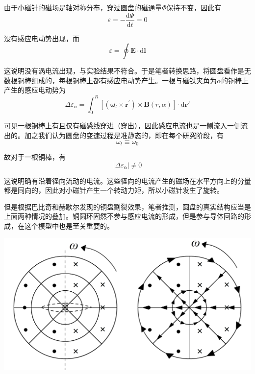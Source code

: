 \documentclass{CLGPY}
\begin{document}
\begin{multicols}{1}
由于小磁针的磁场是轴对称分布，穿过圆盘的磁通量$\Phi$保持不变，因此有
\begin{equation}
\varepsilon=-\frac{\mathrm{d} \Phi}{\mathrm{d} t}=0
\end{equation}

没有感应电动势出现，而
\begin{equation}
\varepsilon=\oint \boldsymbol{E} \cdot \mathrm{d} \boldsymbol{l}
\end{equation}

这说明没有涡电流出现，与实验结果不符合。于是笔者转换思路，将圆盘看作是无数根铜棒组成的，每根铜棒上都有感应电动势产生。一根与磁铁夹角为$\alpha$的铜棒上产生的感应电动势为
\begin{equation}
\Delta \varepsilon_{\alpha}=\int_{0}^{R}\left[\left(\boldsymbol{\omega}_{t} \times \bm{r^{\prime}}\right) \times \boldsymbol{B}(r, \alpha)\right] \cdot \mathrm{d} \boldsymbol{r'}
\end{equation}


可见一根铜棒上有且仅有磁感线穿进（穿出），因此感应电流也是一侧流入一侧流出的。加之我们认为圆盘的变速过程是准静态的，即在每个研究阶段，有
\begin{equation}
\omega_t\equiv \omega_0
\end{equation}

故对于一根铜棒，有
\begin{equation}
|\Delta\varepsilon_\alpha|\neq0
\end{equation}

这说明确有沿着径向流动的电流。这些径向的电流产生的磁场在水平方向上的分量都是同向的，因此对小磁针产生一个转动力矩，所以小磁针发生了旋转。

但是根据巴比奇和赫歇尔发现的铜盘割裂效果，笔者推测，圆盘的真实结构应当是上面两种情况的叠加。铜圆环固然不参与感应电流的形成，但是参与导体回路的形成，在这个模型中也是至关重要的。
        \begin{center}
            \includegraphics[scale=.16]{./fig/20210614153906.png}
        \end{center}


\end{multicols}
\end{document}
